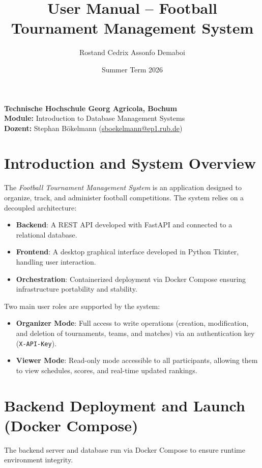 \documentclass[11pt,a4paper]{article}
\title{\textbf{User Manual -- Football Tournament Management System}}
\author{Rostand Cedrix Assonfo Demaboi}
\date{Summer Term 2026}
\begin{document}
\maketitle

\noindent\textbf{Technische Hochschule Georg Agricola, Bochum} \\
\textbf{Module:} Introduction to Database Management Systems \\
\textbf{Dozent:} Stephan Bökelmann (\href{mailto:sboekelmann@ep1.rub.de}{sboekelmann@ep1.rub.de})

\vspace{1cm}

\section{Introduction and System Overview}

The \emph{Football Tournament Management System} is an application designed to organize, track, and administer football competitions. The system relies on a decoupled architecture:
\begin{itemize}
    \item \textbf{Backend}: A REST API developed with FastAPI and connected to a relational database.
    \item \textbf{Frontend}: A desktop graphical interface developed in Python Tkinter, handling user interaction.
    \item \textbf{Orchestration}: Containerized deployment via Docker Compose ensuring infrastructure portability and stability.
\end{itemize}

Two main user roles are supported by the system:
\begin{itemize}
    \item \textbf{Organizer Mode}: Full access to write operations (creation, modification, and deletion of tournaments, teams, and matches) via an authentication key (\texttt{X-API-Key}).
    \item \textbf{Viewer Mode}: Read-only mode accessible to all participants, allowing them to view schedules, scores, and real-time updated rankings.
\end{itemize}

\section{Backend Deployment and Launch (Docker Compose)}

The backend server and database run via Docker Compose to ensure runtime environment integrity.
\end{document}
